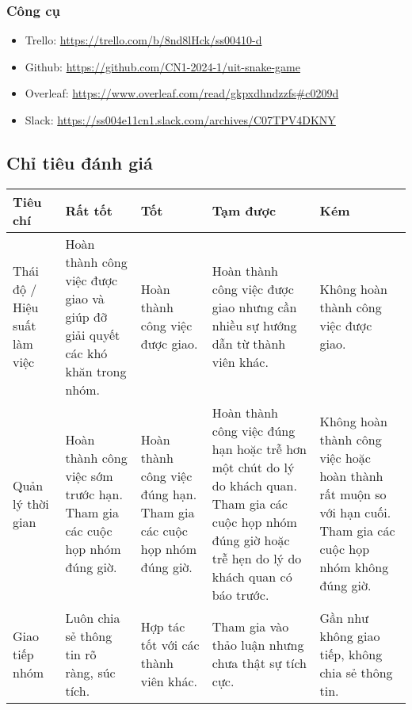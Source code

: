 \documentclass[a4paper,12pt]{article}
\begin{document}
\subsubsection{Công cụ}
\begin{itemize}
    \item Trello: \href{https://trello.com/b/8nd8lHck/ss00410-d}{https://trello.com/b/8nd8lHck/ss00410-d}
    \item Github: \href{https://github.com/CN1-2024-1/uit-snake-game}{https://github.com/CN1-2024-1/uit-snake-game}
    \item Overleaf: \href{https://www.overleaf.com/read/gkpxdhndzzfs#c0209d}{https://www.overleaf.com/read/gkpxdhndzzfs#c0209d}
    \item Slack: \href{https://ss004e11cn1.slack.com/archives/C07TPV4DKNY} {https://ss004e11cn1.slack.com/archives/C07TPV4DKNY}
\end{itemize}

\subsection{Chỉ tiêu đánh giá}
\begin{tabularx}{\textwidth}{|X|X|X|X|X|}
\hline
\textbf{Tiêu chí} & \textbf{Rất tốt} & \textbf{Tốt} & \textbf{Tạm được} & \textbf{Kém} \\
\hline
Thái độ / Hiệu suất làm việc & Hoàn thành công việc được giao và giúp đỡ giải quyết các khó khăn trong nhóm. & Hoàn thành công việc được giao. & Hoàn thành công việc được giao nhưng cần nhiều sự hướng dẫn từ thành viên khác. & Không hoàn thành công việc được giao. \\
\hline
Quản lý thời gian & Hoàn thành công việc sớm trước hạn. Tham gia các cuộc họp nhóm đúng giờ. & Hoàn thành công việc đúng hạn.  Tham gia các cuộc họp nhóm đúng giờ.& Hoàn thành công việc đúng hạn hoặc trễ hơn một chút do lý do khách quan.  Tham gia các cuộc họp nhóm đúng giờ hoặc trễ hẹn do lý do khách quan có báo trước.& Không hoàn thành công việc hoặc hoàn thành rất muộn so với hạn cuối.  Tham gia các cuộc họp nhóm không đúng giờ.\\
\hline
Giao tiếp nhóm & Luôn chia sẻ thông tin rõ ràng, súc tích. & Hợp tác tốt với các thành viên khác. & Tham gia vào thảo luận nhưng chưa thật sự tích cực. & Gần như không giao tiếp, không chia sẻ thông tin. \\
\hline
\end{tabularx}

\newpage
\end{document}
